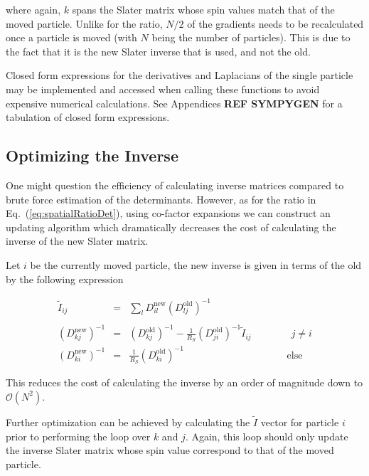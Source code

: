 where again, $k$ spans the Slater matrix whose spin values match that of the moved particle. Unlike for the ratio, $N/2$ of the gradients needs to be recalculated once a particle is moved (with $N$ being the number of particles). This is due to the fact that it is the new Slater inverse that is used, and not the old.

Closed form expressions for the derivatives and Laplacians of the single particle may be implemented and accessed when calling these functions to avoid expensive numerical calculations. See Appendices \textbf{REF SYMPYGEN} for a tabulation of closed form expressions.

\subsection{Optimizing the Inverse}

One might question the efficiency of calculating inverse matrices compared to brute force estimation of the determinants. However, as for the ratio in Eq.~(\ref{eq:spatialRatioDet}), using co-factor expansions we can construct an updating algorithm which dramatically decreases the cost of calculating the inverse of the new Slater matrix.

Let $i$ be the currently moved particle, the new inverse is given in terms of the old by the following expression \cite{abInitioMC, morten}

\begin{eqnarray}
 \tilde I_{ij} &=& \sum_l D_{il}^\mathrm{new}(D_{lj}^\mathrm{old})^{-1} \\
 \ \nonumber\\
 (D_{kj}^\mathrm{new})^{-1} &=& (D_{kj}^\mathrm{old})^{-1} - \frac{1}{R_S}(D_{ji}^\mathrm{old})^{-1}\tilde I_{ij} \qquad\qquad j \ne i\\
 (D_{ki}^\mathrm{new})^{-1} &=& \frac{1}{R_S}(D_{ki}^\mathrm{old})^{-1} \qquad\qquad\qquad\qquad\qquad\,\, \mathrm{else}
\end{eqnarray}


This reduces the cost of calculating the inverse by an order of magnitude down to $\mathcal{O}(N^2)$.

Further optimization can be achieved by calculating the $\tilde I$ vector for particle $i$ prior to performing the loop over $k$ and $j$. Again, this loop should only update the inverse Slater matrix whose spin value correspond to that of the moved particle.











